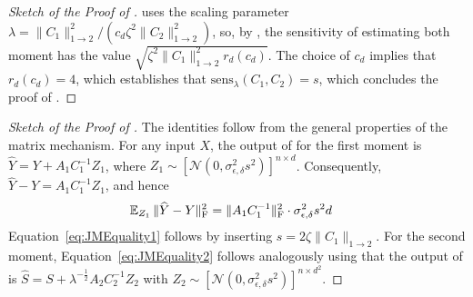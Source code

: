 \begin{proof}[Sketch of the Proof of ]
 uses the scaling parameter $\lambda=\|C_1\|_{1\to 2}^2/(c_d\zeta^2\|C_2\|_{1 \to 2}^2)$, so, by , the sensitivity of estimating both moment has the value $\sqrt{\zeta^2 \|C_1\|_{1 \to 2}^2 r_d(c_d)}$. The choice of $c_d$ implies that $r_d(c_d)=4$, which establishes that 
$\text{sens}_{\lambda}(C_1,C_2)=s$, which concludes the proof of .
\end{proof}

\begin{proof}[Sketch of the Proof of ] The identities follow from the general 
properties of the matrix mechanism.
%
For any input $X$, the output of  for the first moment is $\widehat Y=Y + A_1C^{-1}_1Z_1$, where $Z_1\sim[\mathcal{N}(0, \sigma_{\epsilon, \delta}^2 s^2)]^{n\times d}$. Consequently, $\widehat Y-Y = A_1C^{-1}_1Z_1$, and hence 
\begin{align*}
\operatorname{\mathbb E}_{Z_1}\|\widehat Y-Y\|^2_{\text{F}} 
&= \|A_1C^{-1}_1\|^2_{\text{F}}\cdot \sigma^2_{\epsilon, \delta} s^2 d
\end{align*}
Equation~\eqref{eq:JMEquality1} follows by inserting $s=2\zeta \|C_1\|_{1 \to 2}$. 
%
For the second moment, Equation~\eqref{eq:JMEquality2} follows analogously using
that the output of  is $\widehat S=S+\lambda^{-\frac12}A_2C^{-1}_{2}Z_2$
with $Z_2\sim[\mathcal{N}(0, \sigma_{\epsilon, \delta}^2 s^2)]^{n\times d^2}$. 
\end{proof}
